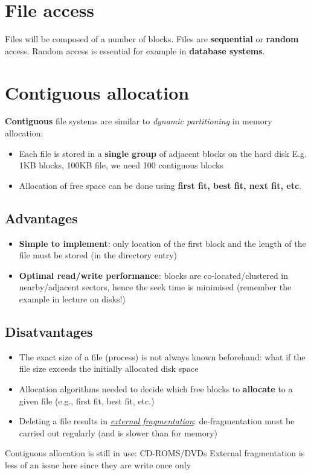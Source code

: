 \documentclass{article}
\newcommand{\worddef}[1]{\hyperref[sec:reference]{\textit{#1}}}
\begin{document}
\section{File access}
\begin{flushleft}
Files will be composed of a number of blocks. Files are \textbf{sequential} or \textbf{random} access. Random access is essential for example in \textbf{database systems}.
\end{flushleft}

\section{Contiguous allocation}
\begin{flushleft}
\textbf{Contiguous} file systems are similar to \textit{dynamic partitioning} in memory allocation:
\begin{itemize}
	\item Each file is stored in a \textbf{single group} of adjacent blocks on the hard disk E.g. 1KB blocks, 100KB file, we need 100 contiguous blocks
	\item Allocation of free space can be done using \textbf{first fit, best fit, next fit, etc}.
\end{itemize}
\end{flushleft}

\subsection{Advantages}
\begin{itemize}
	\item \textbf{Simple to implement}: only location of the first block and the length of the file must be stored (in the directory entry)
	\item \textbf{Optimal read/write performance}: blocks are co-located/clustered in nearby/adjacent sectors, hence the seek time is minimised (remember the example in lecture on disks!)
\end{itemize}

\subsection{Disatvantages}
\begin{flushleft}
\begin{itemize}
	\item The exact size of a file (process) is not always known beforehand: what if the file size exceeds the initially allocated disk space
	\item Allocation algorithms needed to decide which free blocks to \textbf{allocate} to a given file (e.g., first fit, best fit, etc.)
	\item Deleting a file results in \worddef{external fragmentation}: de-fragmentation must be carried out regularly (and is slower than for memory)
\end{itemize}
	Contiguous allocation is still in use: CD-ROMS/DVDs External fragmentation is less of an issue here since they are write once only
\end{flushleft}
\end{document}

